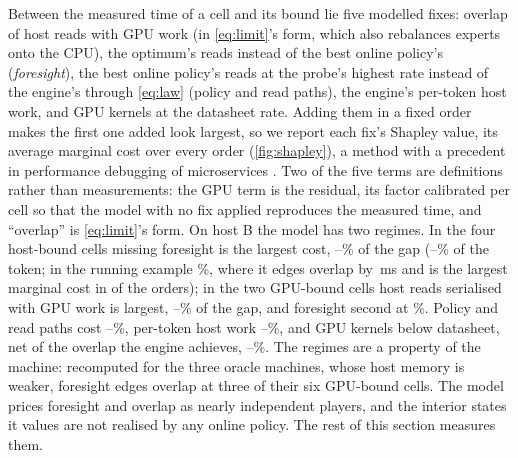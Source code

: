  Between the measured time of a cell and its bound lie five modelled fixes:
overlap of host reads with GPU work (in \cref{eq:limit}'s form, which also rebalances experts onto the CPU), the
optimum's reads instead of the best online policy's (\emph{foresight}), the best online policy's reads at the probe's
highest rate instead of the engine's through \cref{eq:law} (policy and read paths), the engine's per-token host work,
and GPU kernels at the datasheet rate. Adding them in a fixed order makes the first one added look largest, so we
report each fix's Shapley value, its average marginal cost over every order (\cref{fig:shapley}), a method with a
precedent in performance debugging of microservices \citep{shapleyiq2024}. Two of the five terms are definitions
rather than measurements: the GPU term is the residual, its factor calibrated per cell so that the model with no fix
applied reproduces the measured time, and ``overlap'' is \cref{eq:limit}'s form. On host B the model has two regimes.
In the four host-bound cells missing foresight is the largest cost, \shFsHostMin--\shFsHostMax\% of the gap
(\shFsHostTokMin--\shFsHostTokMax\% of the token; in the running example \shFsGMid\%, where it edges overlap by
\shTieMs\,ms and is the largest marginal cost in \shOrdersGMid{} of the \shOrders{} orders); in the two GPU-bound cells
host reads serialised with GPU work is largest, \shOvlGpuMin--\shOvlGpuMax\% of the gap, and foresight second at
\shFsGpuMin\%. Policy and read paths cost \shPolMin--\shPolMax\%, per-token host work \shHostMin--\shHostMax\%, and
GPU kernels below datasheet, net of the overlap the engine achieves, \shGpuMin--\shGpuMax\%. The regimes are a
property of the machine: recomputed for the three oracle machines, whose host memory is weaker, foresight edges overlap at
three of their six GPU-bound cells. The model prices foresight and overlap as nearly independent players, and the
interior states it values are not realised by any online policy. The rest of this section measures them.

